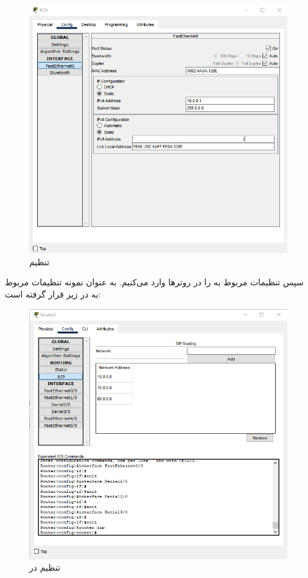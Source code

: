 \documentclass[12pt]{article}
\begin{document}
\begin{figure}[H]
	\centering
	\includegraphics[scale=0.4]{images/rip/6.png}
	\caption{تنظیم } 
	\label{configip}
\end{figure}

سپس تنظیمات مربوط به  را در روترها وارد می‌کنیم. به عنوان نمونه تنظیمات مربوط به  در زیر قرار گرفته است:

\begin{figure}[H]
	\centering
	\includegraphics[scale=0.4]{images/rip/4.png}
	\caption{تنظیم  در } 
	\label{ripr2}
\end{figure}
\end{document}
